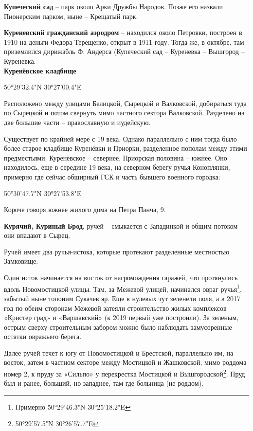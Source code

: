 \medskip

\textbf{Купеческий сад} – парк около Арки Дружбы Народов. Позже его назвали Пионерским парком, ныне – Крещатый парк.\\

\medskip

\textbf{Куреневский гражданский аэродром} – находился около Петровки, построен в 1910 на деньги Федора Терещенко, открыт в 1911 году. Тогда же, в октябре, там приземлился дирижабль Ф. Андерса (Купеческий сад – Куреневка – Вышгород – Куреневка.\\ 

\textbf{Куренёвское кладбище} 

50°29'32.4"N 30°27'00.4"E

Расположено между улицами Белицкой, Сырецкой и Валковской, добираться туда по Сырецкой и потом свернуть мимо частного сектора Валковской. Разделено на две большие части – православную и иудейскую. 

Существует по крайней мере с 19 века. Однако параллельно с ним тогда было более старое кладбище Куренёвки и Приорки, разделенное пополам между этими предместьями. Куренёвское – севернее, Приорская половина – южнее. Оно находилось, еще в середине 19 века, на северном берегу ручья Коноплянки, примерно где сейчас обширный ГСК и часть бывшего военного городка:

50°30'47.7"N 30°27'53.8"E

Короче говоря южнее жилого дома на Петра Панча, 9.\\

\medskip


\textbf{Курячий, Куриный Брод}, ручей – смыкается с Западинкой и общим потоком они впадают в Сырец.

Ручей имеет два ручья-истока, которые протекают разделенные местностью Замковище. 

Один исток начинается на восток от нагромождения гаражей, что протянулись вдоль Новомостицкой улицы. Там, за Межевой улицей,  начинался овраг ручья\footnote{Примерно 50°29'46.3"N 30°25'18.2"E}, забытый ныне топоним Сукачев яр. Еще в нулевых тут зеленели поля, а в 2017 год по обеим сторонам Межевой затеяли строительство жилых комплексов «Кристер град» и «Варшавский» (к 2019 первый уже построили). За зеленым, острым сверху строительным забором можно было наблюдать замусоренные остатки овражьего берега.

Далее ручей течет к югу от Новомостицкой и Брестской, параллельно им, на восток, затем в частном секторе между Мостицкой и Жашковской, мимо роддома номер 2, к пруду за «Сильпо» у перекрестка Мостицкой и Вышгородской\footnote{50°29'57.5"N 30°26'57.7"E}. Пруд был и ранее, больший, но западнее, там где больница (не роддом).

